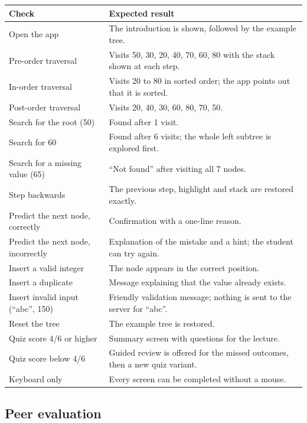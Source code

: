 \documentclass[11pt,a4paper]{article}
\begin{document}
\begin{longtable}{@{}p{5.6cm} p{9.4cm}@{}}
  \toprule
  \textbf{Check} & \textbf{Expected result} \\
  \midrule
  \endhead
  Open the app & The introduction is shown, followed by the example tree. \\
  Pre-order traversal & Visits 50, 30, 20, 40, 70, 60, 80 with the stack shown at each step. \\
  In-order traversal & Visits 20 to 80 in sorted order; the app points out that it is sorted. \\
  Post-order traversal & Visits 20, 40, 30, 60, 80, 70, 50. \\
  Search for the root (50) & Found after 1 visit. \\
  Search for 60 & Found after 6 visits; the whole left subtree is explored first. \\
  Search for a missing value (65) & ``Not found'' after visiting all 7 nodes. \\
  Step backwards & The previous step, highlight and stack are restored exactly. \\
  Predict the next node, correctly & Confirmation with a one-line reason. \\
  Predict the next node, incorrectly & Explanation of the mistake and a hint; the student can try again. \\
  Insert a valid integer & The node appears in the correct position. \\
  Insert a duplicate & Message explaining that the value already exists. \\
  Insert invalid input (``abc'', 150) & Friendly validation message; nothing is sent to the server for ``abc''. \\
  Reset the tree & The example tree is restored. \\
  Quiz score 4/6 or higher & Summary screen with questions for the lecture. \\
  Quiz score below 4/6 & Guided review is offered for the missed outcomes, then a new quiz variant. \\
  Keyboard only & Every screen can be completed without a mouse. \\
  \bottomrule
\end{longtable}

\subsection{Peer evaluation}
\end{document}
